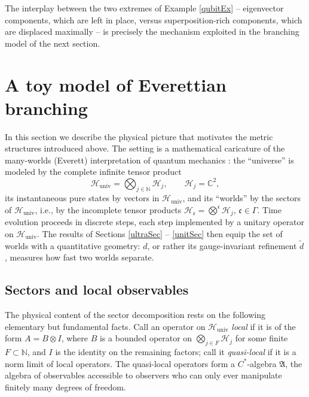\documentclass[twoside,11pt,letter]{article}
\def\bC{\mathbb{C}}
\def\bN{\mathbb{N}}
\def\cH{{\mathcal{H}}}
\def\fc{{\mathfrak{c}}}
\theoremstyle{definition}
\theoremstyle{definition}
\theoremstyle{plain}
\newenvironment{remark}[1][Remark.]{\begin{trivlist}
\item[\hskip \labelsep {\bfseries #1}]}{\end{trivlist}}
\begin{document}
\begin{remark}
The interplay between the two extremes of Example \ref{qubitEx} -- eigenvector components, which are left in place, versus superposition-rich components, which are displaced maximally -- is precisely the mechanism exploited in the branching model of the next section.
\end{remark}


\section{\label{everettSec}A toy model of Everettian branching}

In this section we describe the physical picture that motivates the metric structures introduced above. The setting is a mathematical caricature of the many-worlds (Everett) interpretation of quantum mechanics \cite{E57}: the ``universe'' is modeled by the complete infinite tensor product
\begin{equation*}
\cH_{\mathrm{univ}}=\bigotimes_{j\in\bN}\cH_j,\qquad \cH_j=\bC^2,
\end{equation*}
its instantaneous pure states by vectors in $\cH_{\mathrm{univ}}$, and its ``worlds'' by the sectors of $\cH_{\mathrm{univ}}$, i.e., by the incomplete tensor products $\cH_\fc=\bigotimes^\fc\cH_j$, $\fc\in\Gamma$. Time evolution proceeds in discrete steps, each step implemented by a unitary operator on $\cH_{\mathrm{univ}}$. The results of Sections \ref{ultraSec} -- \ref{unitSec} then equip the set of worlds with a quantitative geometry: $d$, or rather its gauge-invariant refinement $\tilde d$, measures how fast two worlds separate.

\subsection{Sectors and local observables}

The physical content of the sector decomposition rests on the following elementary but fundamental facts. Call an operator on $\cH_{\mathrm{univ}}$ \emph{local} if it is of the form $A=B\otimes I$, where $B$ is a bounded operator on $\bigotimes_{j\in F}\cH_j$ for some finite $F\subset\bN$, and $I$ is the identity on the remaining factors; call it \emph{quasi-local} if it is a norm limit of local operators. The quasi-local operators form a $C^\ast$-algebra $\mathfrak{A}$, the algebra of observables accessible to observers who can only ever manipulate finitely many degrees of freedom.
\end{document}
